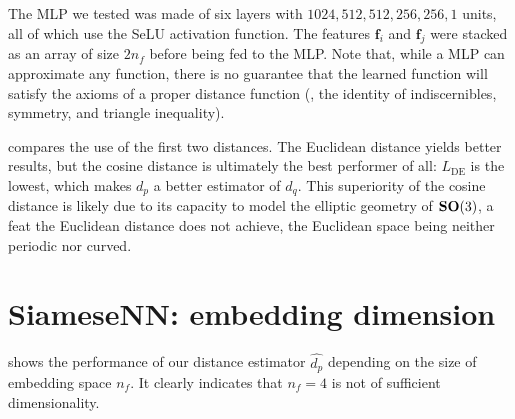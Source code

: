 The MLP we tested was made of six layers with $1024, 512, 512, 256, 256, 1$ units, all of which use the SeLU activation function. The features $\mathbf{f}_i$ and $\mathbf{f}_j$ were stacked as an array of size $2n_f$ before being fed to the MLP\@. Note that, while a MLP can approximate any function, there is no guarantee that the learned function will satisfy the axioms of a proper distance function (\ie, the identity of indiscernibles, symmetry, and triangle inequality). 

 compares the use of the first two distances. The Euclidean distance yields better results, but the cosine distance is ultimately the best performer of all: $L_\text{DE}$ is the lowest, which makes $d_p$ a better estimator of $d_q$.
This superiority of the cosine distance is likely due to its capacity to model the elliptic geometry of $\mathrm{\mathbf{SO}}(3)$, a feat the Euclidean distance does not achieve, the Euclidean space being neither periodic nor curved.

\section{SiameseNN: embedding dimension}\label{apx:siamese:embedding-dimension}

 shows the performance of our distance estimator $\widehat{d_p}$ depending on the size of embedding space $n_f$.
It clearly indicates that $n_f=4$ is not of sufficient dimensionality.


